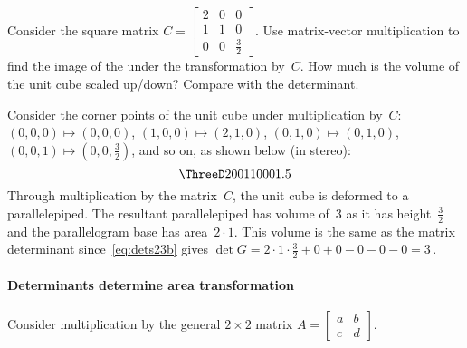 \begin{example} \label{eg:detarea3}
Consider the square matrix \(C=\begin{bmatrix} 2&0&0\\1&1&0\\0&0&\frac32 \end{bmatrix}\).
Use matrix-vector multiplication to find the image of the  under the transformation by~\(C\).
How much is the volume of the unit cube scaled up/down?  
Compare with the determinant.
\begin{solution} 
Consider the corner points of the unit cube under multiplication by~\(C\): \((0,0,0)\mapsto(0,0,0)\)\index{$\mapsto$}, \((1,0,0)\mapsto(2,1,0)\), \((0,1,0)\mapsto(0,1,0)\),  \((0,0,1)\mapsto(0,0,\frac32)\), and so on, as shown below (in stereo):
\begin{equation*}
\def\unithousesize{small}
\ThreeD20011000{1.5}
\end{equation*}
Through multiplication by the matrix~\(C\), the unit cube is deformed to a parallelepiped.
The resultant parallelepiped has volume of~\(3\) as it has height~\(\frac32\) and the parallelogram base has area~\(2\cdot1\).
This volume is the same  as the matrix determinant since~\eqref{eq:dets23b} gives \(\det G=2\cdot1\cdot\frac32+0+0-0-0-0=3\)\,.
\end{solution}
\end{example}






\paragraph{Determinants determine area transformation}
Consider multiplication by the general \(2\times2\) matrix \(A=\begin{bmatrix} a&b\\c&d \end{bmatrix}\).

